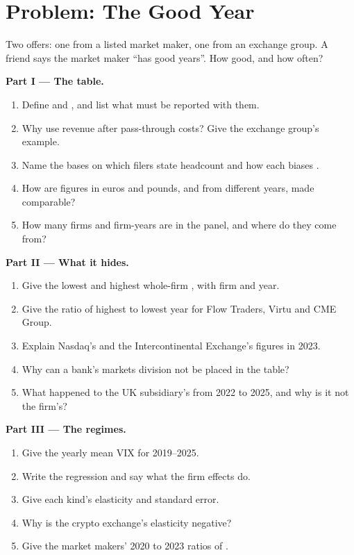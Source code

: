 \section{Problem: The Good Year}

\begin{problem}\label{pb:in:revenue-and-profit-across-the-industry:1}
Two offers: one from a listed market maker, one from an exchange group. A friend says the market maker ``has good
years''. How good, and how often?

\medskip\noindent\textbf{Part I --- The table.}
\begin{enumerate}
\item Define  and , and list what must be reported with them.
\item Why use revenue after pass-through costs? Give the exchange group's example.
\item Name the bases on which filers state headcount and how each biases .
\item How are figures in euros and pounds, and from different years, made comparable?
\item How many firms and firm-years are in the panel, and where do they come from?
\end{enumerate}

\medskip\noindent\textbf{Part II --- What it hides.}
\begin{enumerate}[resume]
\item Give the lowest and highest whole-firm , with firm and year.
\item Give the ratio of highest to lowest year for Flow Traders, Virtu and CME Group.
\item Explain Nasdaq's and the Intercontinental Exchange's figures in 2023.
\item Why can a bank's markets division not be placed in the table?
\item What happened to the UK subsidiary's  from 2022 to 2025, and why is it not the firm's?
\end{enumerate}

\medskip\noindent\textbf{Part III --- The regimes.}
\begin{enumerate}[resume]
\item Give the yearly mean VIX for 2019--2025.
\item Write the regression and say what the firm effects do.
\item Give each kind's elasticity and standard error.
\item Why is the crypto exchange's elasticity negative?
\item Give the market makers' 2020 to 2023 ratios of .
\end{enumerate}


\end{problem}
